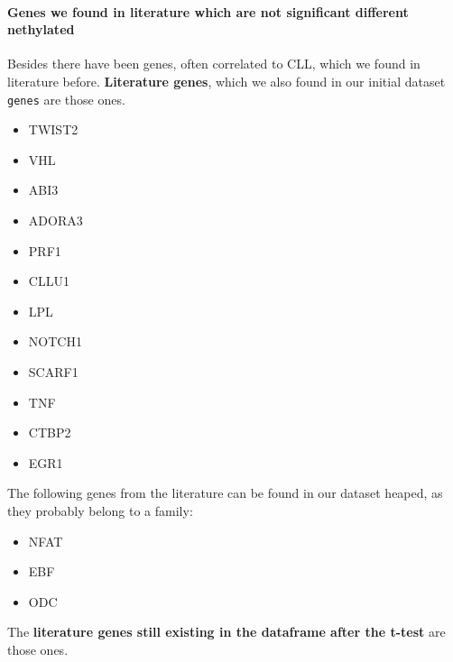 \documentclass[]{article}
\newenvironment{Shaded}{\begin{snugshade}}{\end{snugshade}}
\newcommand{\CommentTok}[1]{\textcolor[rgb]{0.56,0.35,0.01}{\textit{#1}}}
\providecommand{\tightlist}{%
  \setlength{\itemsep}{0pt}\setlength{\parskip}{0pt}}
\let\oldparagraph\paragraph
\renewcommand{\paragraph}[1]{\oldparagraph{#1}\mbox{}}
\begin{document}
\paragraph{Genes we found in literature which are not significant
different
nethylated}\label{genes-we-found-in-literature-which-are-not-significant-different-nethylated}

Besides there have been genes, often correlated to CLL, which we found
in literature before. \textbf{Literature genes}, which we also found in
our initial dataset \texttt{genes} are those ones.

\begin{Shaded}
\end{Shaded}

\begin{itemize}
\tightlist
\item
  TWIST2
\item
  VHL
\item
  ABI3
\item
  ADORA3
\item
  PRF1
\item
  CLLU1
\item
  LPL
\item
  NOTCH1
\item
  SCARF1
\item
  TNF
\item
  CTBP2
\item
  EGR1
\end{itemize}

The following genes from the literature can be found in our dataset
heaped, as they probably belong to a family:

\begin{itemize}
\tightlist
\item
  NFAT
\item
  EBF
\item
  ODC
\end{itemize}

The \textbf{literature genes still existing in the dataframe after the
t-test} are those ones.

\begin{Shaded}
\end{Shaded}
\end{document}
